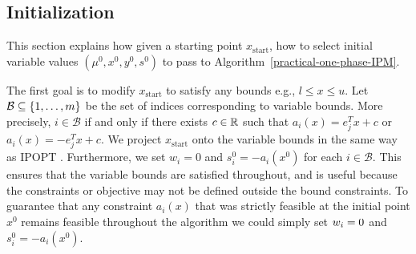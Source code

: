 \documentclass{article}
\begin{document}


\subsection{Initialization}\label{sec:initialization}


This section explains how given a starting point $x_{\text{start}}$, how to select initial variable values $(\mu^0,x^0, y^0, s^0)$ to pass to Algorithm~\ref{practical-one-phase-IPM}.


The first goal is to modify $x_{\text{start}}$ to satisfy any bounds e.g., $l \le x \le u$. Let $\mathcal{B} \subseteq \{ 1, \dots, m \}$ be the set of indices corresponding to variable bounds. More precisely, $i \in \mathcal{B}$ if and only if there exists $c \in \mathbb{R}$ such that $a_i(x) = e_j^T x + c$ or $a_i(x) = -e_j^T x + c$. We project $x_{\text{start}}$ onto the variable bounds in the same way as IPOPT \cite[Section 3.7]{wachter2006implementation}. Furthermore, we set $w_i = 0$ and $s_i^{0} = -a_i(x^0)$ for each $i \in \mathcal{B}$. This ensures that the variable bounds are satisfied throughout, and is useful because the constraints or objective may not be defined outside the bound constraints. To guarantee that any constraint $a_i(x)$ that was strictly feasible at the initial point $x^{0}$ remains feasible throughout the algorithm we could simply set $w_i = 0$ and $s_i^{0} = -a_i(x^0)$.
 




\end{document}
